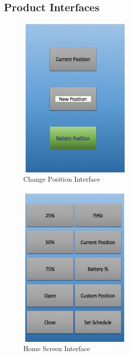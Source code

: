 \subsection{Product Interfaces}
\begin{figure}[H]
    \centering
    \includegraphics[width=0.5\textwidth]{images/ChangePosition}
    \caption{Change Position Interface}
\end{figure}
\begin{figure}[H]
    \centering
    \includegraphics[width=0.5\textwidth]{images/HomeScreen}
    \caption{Home Screen Interface}
\end{figure}